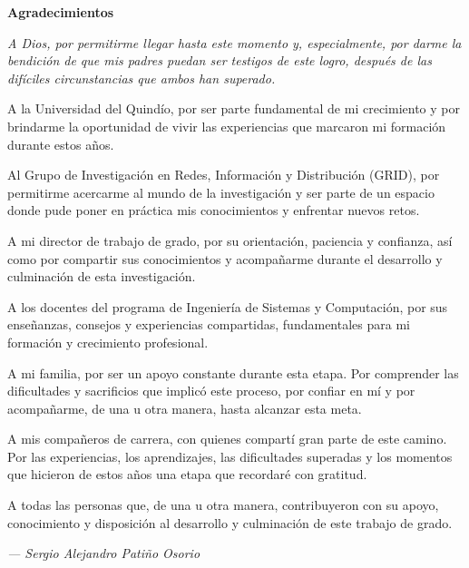 \cleardoublepage%
%
\thispagestyle{empty}


\begin{center}
	{\Large\bfseries Agradecimientos}
\end{center}

\vspace{2cm}

{\centering
	{\itshape
		A Dios, por permitirme llegar hasta este momento y, especialmente, por darme la bendición de que mis padres puedan ser testigos de este logro, después de las difíciles circunstancias que ambos han superado.

		A la Universidad del Quindío, por ser parte fundamental de mi crecimiento y por brindarme la oportunidad de vivir las experiencias que marcaron mi formación durante estos años.

		Al Grupo de Investigación en Redes, Información y Distribución (GRID), por permitirme acercarme al mundo de la investigación y ser parte de un espacio donde pude poner en práctica mis conocimientos y enfrentar nuevos retos.

		A mi director de trabajo de grado, por su orientación, paciencia y confianza, así como por compartir sus conocimientos y acompañarme durante el desarrollo y culminación de esta investigación.

		A los docentes del programa de Ingeniería de Sistemas y Computación, por sus enseñanzas, consejos y experiencias compartidas, fundamentales para mi formación y crecimiento profesional.

		A mi familia, por ser un apoyo constante durante esta etapa. Por comprender las dificultades y sacrificios que implicó este proceso, por confiar en mí y por acompañarme, de una u otra manera, hasta alcanzar esta meta.

		A mis compañeros de carrera, con quienes compartí gran parte de este camino. Por las experiencias, los aprendizajes, las dificultades superadas y los momentos que hicieron de estos años una etapa que recordaré con gratitud.

		A todas las personas que, de una u otra manera, contribuyeron con su apoyo, conocimiento y disposición al desarrollo y culminación de este trabajo de grado.}

	\vspace{2cm}

	\hfill \textit{--- Sergio Alejandro Patiño Osorio}

}

\vspace*{\fill} %

